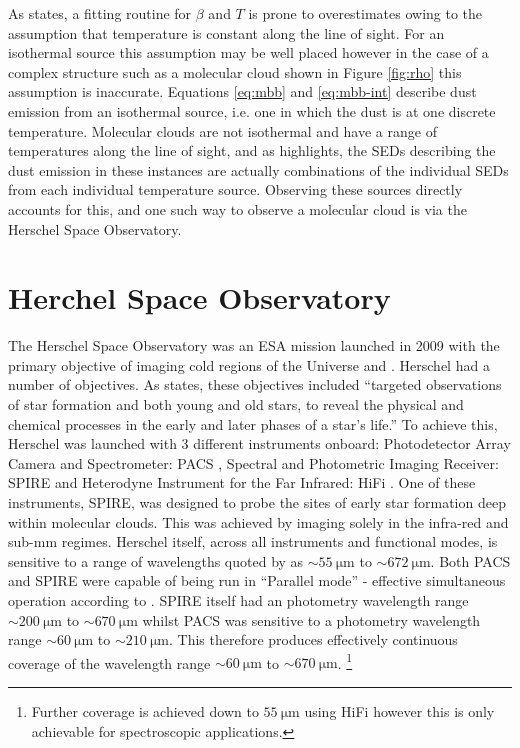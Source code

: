 \documentclass{report}
\begin{document}
As \textcite{noise} states, a fitting routine for $\beta$ and $T$ is prone to overestimates owing to the assumption that temperature is constant along the line of sight. For an isothermal source this assumption may be well placed however in the case of a complex structure such as a molecular cloud shown in Figure \ref{fig:rho} this assumption is inaccurate. Equations \ref{eq:mbb} and \ref{eq:mbb-int} describe dust emission from an isothermal source, i.e. one in which the dust is at one discrete temperature. Molecular clouds are not isothermal and have a range of temperatures along the line of sight, and as \textcite{noise} highlights, the SEDs describing the dust emission in these instances are actually combinations of the individual SEDs from each individual temperature source. Observing these sources directly accounts for this, and one such way to observe a molecular cloud is via the Herschel Space Observatory.

\section{Herchel Space Observatory}
The Herschel Space Observatory was an ESA mission launched in 2009 with the primary objective of imaging cold regions of the Universe \parencite{herschel} and \parencite{fact}. Herschel had a number of objectives. As \textcite{fact} states, these objectives included ``targeted observations of star formation and both young and old stars, to reveal the physical and chemical processes in the early and later phases of a star’s life.'' To achieve this, Herschel was launched with 3 different instruments onboard: Photodetector Array Camera and Spectrometer: PACS \parencite{PACS}, Spectral and Photometric Imaging Receiver: SPIRE \parencite{SPIRE} and Heterodyne Instrument for the Far Infrared: HiFi \parencite{HiFi}. One of these instruments, SPIRE, was designed to probe the sites of early star formation deep within molecular clouds. This was achieved by imaging solely in the infra-red and sub-mm regimes. Herschel itself, across all instruments and functional modes, is sensitive to a range of wavelengths quoted by \textcite{herschel} as $\sim \SI{55}{\micro\meter}$ to $\sim \SI{672}{\micro\meter}$. Both PACS and SPIRE were capable of being run in ``Parallel mode'' - effective simultaneous operation according to \textcite{herschel}. SPIRE itself had an photometry wavelength range
$\sim \SI{200}{\micro\meter}$ to $\sim \SI{670}{\micro\meter}$ whilst PACS was sensitive to a photometry wavelength range $\sim \SI{60}{\micro\meter}$ to $\sim \SI{210}{\micro\meter}$. This therefore produces effectively continuous coverage of the wavelength range $\sim \SI{60}{\micro\meter}$ to $\sim \SI{670}{\micro\meter}$.
\footnote{Further coverage is achieved down to $\SI{55}{\micro\meter}$ using HiFi however this is only achievable for spectroscopic applications.}
\end{document}

